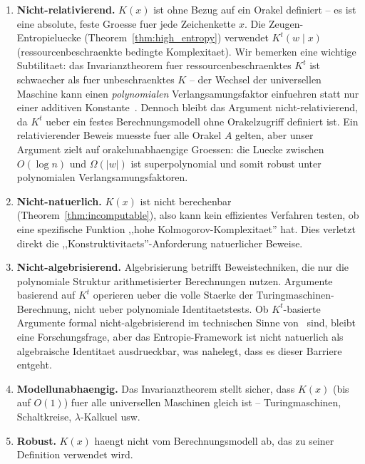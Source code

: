 \documentclass[aps,prd,twocolumn,superscriptaddress,nofootinbib]{revtex4-2}
\theoremstyle{definition}
\theoremstyle{remark}
\begin{document}
\begin{enumerate}
\item[\textbf{(S1)}] \textbf{Nicht-relativierend.} $K(x)$ ist ohne Bezug auf ein Orakel definiert -- es ist eine absolute, feste Groesse fuer jede Zeichenkette $x$. Die Zeugen-Entropieluecke (Theorem~\ref{thm:high_entropy}) verwendet $K^t(w \mid x)$ (ressourcenbeschraenkte bedingte Komplexitaet). Wir bemerken eine wichtige Subtilitaet: das Invarianztheorem fuer ressourcenbeschraenktes $K^t$ ist schwaecher als fuer unbeschraenktes $K$ -- der Wechsel der universellen Maschine kann einen \textit{polynomialen} Verlangsamungsfaktor einfuehren statt nur einer additiven Konstante~\cite{LiVitanyi2008}. Dennoch bleibt das Argument nicht-relativierend, da $K^t$ ueber ein festes Berechnungsmodell ohne Orakelzugriff definiert ist. Ein relativierender Beweis muesste fuer alle Orakel $A$ gelten, aber unser Argument zielt auf orakelunabhaengige Groessen: die Luecke zwischen $O(\log n)$ und $\Omega(|w|)$ ist superpolynomial und somit robust unter polynomialen Verlangsamungsfaktoren.

\item[\textbf{(S2)}] \textbf{Nicht-natuerlich.} $K(x)$ ist nicht berechenbar (Theorem~\ref{thm:incomputable}), also kann kein effizientes Verfahren testen, ob eine spezifische Funktion ,,hohe Kolmogorov-Komplexitaet'' hat. Dies verletzt direkt die ,,Konstruktivitaets''-Anforderung natuerlicher Beweise.

\item[\textbf{(S3)}] \textbf{Nicht-algebrisierend.} Algebrisierung betrifft Beweistechniken, die nur die polynomiale Struktur arithmetisierter Berechnungen nutzen. Argumente basierend auf $K^t$ operieren ueber die volle Staerke der Turingmaschinen-Berechnung, nicht ueber polynomiale Identitaetstests. Ob $K^t$-basierte Argumente formal nicht-algebrisierend im technischen Sinne von~\cite{AaronsonWigderson2009} sind, bleibt eine Forschungsfrage, aber das Entropie-Framework ist nicht natuerlich als algebraische Identitaet ausdrueckbar, was nahelegt, dass es dieser Barriere entgeht.

\item[\textbf{(S4)}] \textbf{Modellunabhaengig.} Das Invarianztheorem stellt sicher, dass $K(x)$ (bis auf $O(1)$) fuer alle universellen Maschinen gleich ist -- Turingmaschinen, Schaltkreise, $\lambda$-Kalkuel usw.

\item[\textbf{(S5)}] \textbf{Robust.} $K(x)$ haengt nicht vom Berechnungsmodell ab, das zu seiner Definition verwendet wird.
\end{enumerate}
\end{document}
